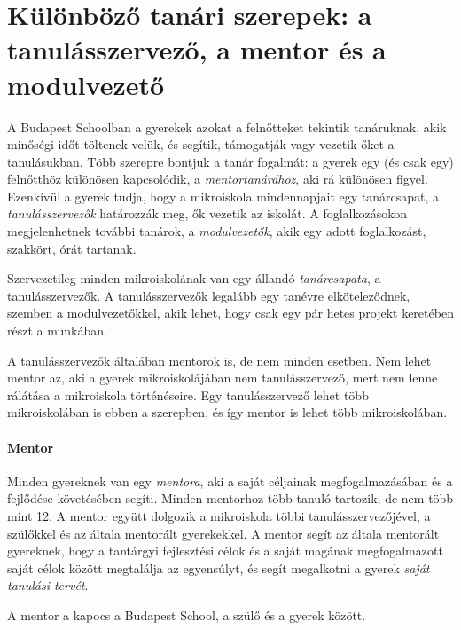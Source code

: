 \section{Különböző tanári szerepek: a tanulásszervező, a mentor és a
    modulvezető}
\label{sec:tanarok}

A Budapest Schoolban a gyerekek azokat a felnőtteket tekintik tanáruknak, akik
minőségi időt töltenek velük, és segítik, támogatják vagy vezetik őket a
tanulásukban. Több szerepre bontjuk a tanár fogalmát: a gyerek egy (és csak
egy) felnőtthöz különösen kapcsolódik, a \emph{mentortanárához}, aki rá
különösen figyel. Ezenkívül a gyerek tudja, hogy a mikroiskola mindennapjait
egy tanárcsapat, a \emph{tanulásszervezők} határozzák meg, ők vezetik az
iskolát.  A foglalkozásokon megjelenhetnek további tanárok, a \emph{modulvezetők},
akik egy adott foglalkozást, szakkört, órát tartanak.

Szervezetileg minden mikroiskolának van egy állandó \emph{tanárcsapata}, a
tanulásszervezők. A tanulásszervezők legalább egy tanévre elköteleződnek, szemben a
modulvezetőkkel, akik lehet, hogy csak egy pár hetes projekt keretében részt a
munkában.

A tanulásszervezők általában mentorok is, de nem minden esetben. Nem lehet
mentor az, aki a gyerek mikroiskolájában nem tanulásszervező, mert nem lenne
rálátása a mikroiskola történéseire. Egy tanulásszervező lehet több
mikroiskolában is ebben a szerepben, és így mentor is lehet több mikroiskolában.

\paragraph{Mentor}
Minden gyereknek van egy \emph{mentora}, aki a saját céljainak
megfogalmazásában és
a fejlődése követésében segíti. Minden mentorhoz több tanuló tartozik, de nem
több mint 12. A mentor együtt dolgozik a mikroiskola többi tanulásszervezőjével, a
szülőkkel és az általa mentorált gyerekekkel. A mentor segít az általa
mentorált gyereknek, hogy a tantárgyi fejlesztési célok és
a
saját magának megfogalmazott saját célok között megtalálja  az egyensúlyt, és segít megalkotni a
gyerek \emph{saját
  tanulási tervét}.

A mentor a kapocs a Budapest School, a szülő és a gyerek között.

